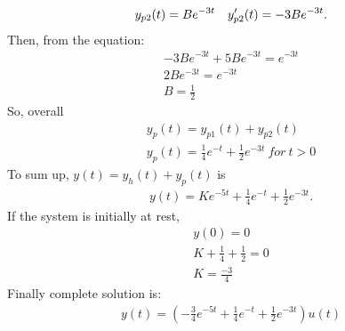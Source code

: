 \documentclass[10pt,a4paper, margin=1in]{article}
\begin{document}
\begin{enumerate}
\begin{enumerate}
\begin{gather*}
        y_{p2}(t)=Be^{-3t} \text{\quad}  y_{p2}'(t)=-3Be^{-3t}.
    \end{gather*}
    Then, from the equation: 
    \begin{gather*}
        -3Be^{-3t}+5Be^{-3t}=e^{-3t} \\
        2Be^{-3t}=e^{-3t} \\
        B=\frac{1}{2}
    \end{gather*}
    So, overall 
    \begin{gather*}
        y_p(t)=y_{p1}(t)+y_{p2}(t) \\
        y_p(t)=\frac{1}{4}e^{-t}+\frac{1}{2}e^{-3t} \ for \ t>0
    \end{gather*}
    To sum up, $y(t)=y_h(t)+y_p(t)$ is 
    \begin{gather*}
        y(t)=Ke^{-5t}+\frac{1}{4}e^{-t}+\frac{1}{2}e^{-3t}.
    \end{gather*}
    If the system is initially at rest, 
    \begin{gather*}
        y(0)=0 \\
        K+\frac{1}{4}+\frac{1}{2}=0 \\
        K=\frac{-3}{4}
    \end{gather*}
    Finally complete solution is:  
    \begin{gather*}
        y(t)=(-\frac{3}{4}e^{-5t}+\frac{1}{4}e^{-t}+\frac{1}{2}e^{-3t})u(t)
    \end{gather*}
    \\
    \end{enumerate}


\end{enumerate}
\end{document}
